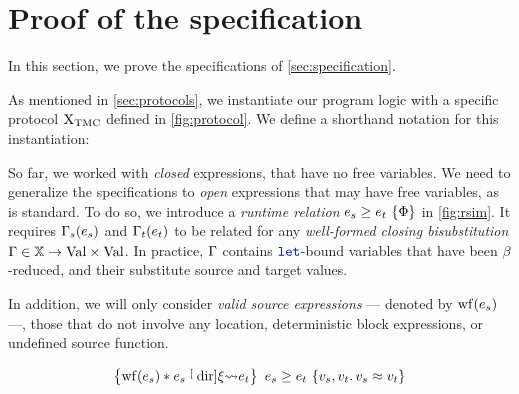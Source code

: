 \section{Proof of the specification}
\label{sec:proof}

In this section, we prove the specifications of \cref{sec:specification}.

As mentioned in \cref{sec:protocols}, we instantiate our program logic with a specific protocol $\mathrm{X}_\mathrm{TMC}$ defined in \cref{fig:protocol}. We define a shorthand notation for this instantiation:
\begin{mathline}
    \coloneqq
\end{mathline}

So far, we worked with \emph{closed} expressions, that have no free variables.
We need to generalize the specifications to \emph{open} expressions that may have free variables, as is standard.
To do so, we introduce a \emph{runtime relation} $\iRsimv{\iPred}{\datalangExpr_s}{\datalangExpr_t}$ in \cref{fig:rsim}.
It requires $\datalangBisubst_s (\datalangExpr_s)$ and $\datalangBisubst_t (\datalangExpr_t)$ to be related for any \emph{well-formed closing bisubstitution} $\datalangBisubst \in \datalangVar[] \rightarrow \datalangVal[] \times \datalangVal[]$.
In practice, $\datalangBisubst$ contains $\datalangLetKeyword$-bound variables that have been $\beta$-reduced, and their substitute source and target values.

In addition, we will only consider \emph{valid source expressions} --- denoted by $\wf{\datalangExpr_s}$ ---, \ie those that do not involve any location, deterministic block expressions, or undefined source function.

\begin{lemma} \label{thm:dir}
    \[
        \iRsimvHoare{
            \wf{\datalangExpr_s} \iSep
            \datalangExpr_s \tmcDir{\datalangRenaming} \datalangExpr_t
        }{
            \datalangVal_s, \datalangVal_t \ldotp
            \datalangVal_s \iSimilar \datalangVal_t
        }{
            \datalangExpr_s
        }{
            \datalangExpr_t
        }
    \]
\end{lemma}

